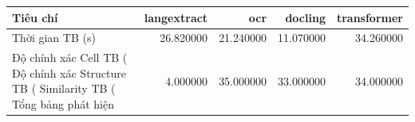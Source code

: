 \begin{tabular}{lrrrr}
\toprule
Tiêu chí & langextract & ocr & docling & transformer \\
\midrule
Thời gian TB (s) & 26.820000 & 21.240000 & 11.070000 & 34.260000 \\
Độ chính xác Cell TB (%
Độ chính xác Structure TB (%
Similarity TB (%
Tổng bảng phát hiện & 4.000000 & 35.000000 & 33.000000 & 34.000000 \\
\bottomrule
\end{tabular}
